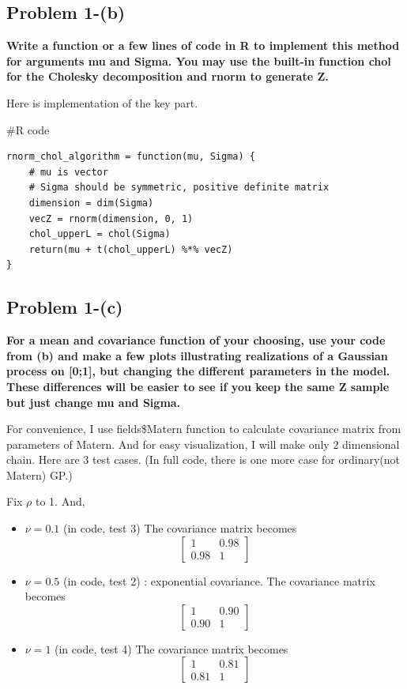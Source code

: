 \documentclass{article}
\newenvironment{Rcode}%
{%
    \begin{mdframed}
    \#R code
    \begin{small}
}
{%
    \end{small}
    \end{mdframed}
}
\begin{document}
\subsection{Problem 1-(b)}
\textbf{
Write a function or a few lines of code in R to implement this method
for arguments mu and Sigma. You may use the built-in function chol for the Cholesky decomposition and rnorm to generate Z.
}

Here is implementation of the key part.

\begin{Rcode}
    \begin{verbatim}
rnorm_chol_algorithm = function(mu, Sigma) {
    # mu is vector
    # Sigma should be symmetric, positive definite matrix
    dimension = dim(Sigma)
    vecZ = rnorm(dimension, 0, 1)
    chol_upperL = chol(Sigma)
    return(mu + t(chol_upperL) %*% vecZ)    
}
    \end{verbatim}
\end{Rcode}



\subsection{Problem 1-(c)}
\textbf{
For a mean and covariance function of your choosing, use your code from (b) and
make a few plots illustrating realizations of a Gaussian process on [0;1], but changing the different parameters in the model.
These differences will be easier to see if you keep the same Z sample but just change mu and Sigma.
}

For convenience, I use fields\$Matern function to calculate covariance matrix from parameters of Matern.
And for easy visualization, I will make only 2 dimensional chain.
Here are 3 test cases. (In full code, there is one more case for ordinary(not Matern) GP.)

Fix $\rho$ to 1. And,
\begin{itemize}
    \item $\nu = 0.1$ (in code, test 3)
    The covariance matrix becomes
    \[\begin{bmatrix}
        1 & 0.98 \\ 0.98 & 1
    \end{bmatrix}
    \]
    \item $\nu = 0.5$ (in code, test 2) : exponential covariance. 
    The covariance matrix becomes
    \[\begin{bmatrix}
        1 & 0.90 \\ 0.90 & 1
    \end{bmatrix}
    \]
    \item $\nu = 1$ (in code, test 4)
    The covariance matrix becomes
    \[\begin{bmatrix}
        1 & 0.81 \\ 0.81 & 1
    \end{bmatrix}
    \]
\end{itemize}
\end{document}
